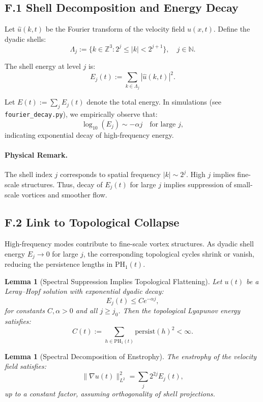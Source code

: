 \documentclass[11pt]{article}
\newtheorem{lemma}[theorem]{Lemma}
\theoremstyle{definition}
\begin{document}
\subsection*{F.1 Shell Decomposition and Energy Decay}

Let \( \hat{u}(k, t) \) be the Fourier transform of the velocity field \( u(x, t) \). Define the dyadic shells:
\[ 
\Lambda_j := \{k \in \mathbb{Z}^3 : 2^j \leq |k| < 2^{j+1}\}, \quad j \in \mathbb{N}. 
\]

The shell energy at level \( j \) is:
\[ 
E_j(t) := \sum_{k \in \Lambda_j} |\hat{u}(k, t)|^2.
\]

Let \( E(t) := \sum_j E_j(t) \) denote the total energy. In simulations (see \texttt{fourier\_decay.py}), we
empirically observe that:
\[ 
\log_{10}(E_j) \sim -\alpha j \quad \text{for large } j, 
\]
indicating exponential decay of high-frequency energy.

\paragraph{Physical Remark.} The shell index \( j \) corresponds to spatial frequency \( |k| \sim 2^j \). High \( j \)
implies fine-scale structures. Thus, decay of \( E_j(t) \) for large \( j \) implies suppression of small-scale vortices
and smoother flow.

\subsection*{F.2 Link to Topological Collapse}

High-frequency modes contribute to fine-scale vortex structures. As dyadic shell energy \( E_j \to 0 \) for
large \( j \), the corresponding topological cycles shrink or vanish, reducing the persistence lengths in
\( \mathrm{PH}_1(t) \).

\begin{lemma}[Spectral Suppression Implies Topological Flattening]
Let \( u(t) \) be a Leray--Hopf solution with exponential dyadic decay:
\[ 
E_j(t) \leq C e^{-\alpha j},
\]
for constants \( C, \alpha > 0 \) and all \( j \geq j_0 \). Then the topological Lyapunov energy satisfies:
\[ 
C(t) := \sum_{h \in \mathrm{PH}_1(t)} \text{persist}(h)^2 < \infty.
\]
\end{lemma}

\begin{lemma}[Spectral Decomposition of Enstrophy]
The enstrophy of the velocity field satisfies:
\[ 
\|\nabla u(t)\|_{L^2}^2 = \sum_j 2^{2j} E_j(t),
\]
up to a constant factor, assuming orthogonality of shell projections.
\end{lemma}
\end{document}
